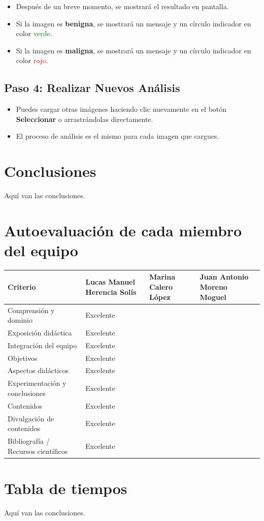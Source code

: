 \documentclass[12pt]{article} %
\begin{document}
\begin{itemize}
    \item Después de un breve momento, se mostrará el resultado en pantalla.
    \item Si la imagen es \textbf{benigna}, se mostrará un mensaje y un círculo indicador en color \textcolor{green}{verde}.
    \item Si la imagen es \textbf{maligna}, se mostrará un mensaje y un círculo indicador en color \textcolor{red}{rojo}.
\end{itemize}

\subsection*{Paso 4: Realizar Nuevos Análisis}

\begin{itemize}
    \item Puedes cargar otras imágenes haciendo clic nuevamente en el botón \textbf{Seleccionar} o arrastrándolas directamente.
    \item El proceso de análisis es el mismo para cada imagen que cargues.
\end{itemize}


\section{Conclusiones}
Aquí van las conclusiones.

\section{Autoevaluación de cada miembro del equipo}
\renewcommand{\tablename}{Tabla}

\begin{tabular}{|m{5cm}|m{3.5cm}|m{3.5cm}|m{3.5cm}|}
    \hline
    \textbf{Criterio} & \textbf{Lucas Manuel} \newline \textbf{Herencia Solís} & \textbf{Marina Calero} \newline \textbf{López} & \textbf{Juan Antonio} \newline \textbf{Moreno Moguel} \\
    \hline
    Comprensión y dominio & Excelente & & \\
    \hline
    Exposición didáctica & Excelente & & \\
    \hline
    Integración del equipo & Excelente & & \\
    \hline
    Objetivos & Excelente & & \\
    \hline
    Aspectos didácticos & Excelente & & \\
    \hline
    Experimentación y conclusiones & Excelente & & \\
    \hline
    Contenidos & Excelente & & \\
    \hline
    Divulgación de contenidos & Excelente & & \\
    \hline
    Bibliografía / Recursos científicos & Excelente & & \\
    \hline
    
\end{tabular}

\section{Tabla de tiempos}
Aquí van las conclusiones.

\printbibliography
\end{document}
